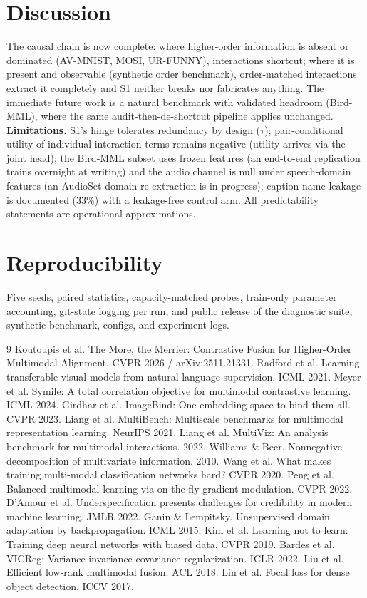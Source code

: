 \documentclass[10pt,twocolumn]{article}
\begin{document}
\section{Discussion}
The causal chain is now complete: where higher-order information is absent or dominated
(AV-MNIST, MOSI, UR-FUNNY), interactions shortcut; where it is present and observable (synthetic
order benchmark), order-matched interactions extract it completely and S1 neither breaks nor
fabricates anything. The immediate future work is a natural benchmark with validated headroom
(Bird-MML), where the same audit-then-de-shortcut pipeline applies unchanged.
\textbf{Limitations.} S1's hinge tolerates redundancy by design ($\tau$); pair-conditional
utility of individual interaction terms remains negative (utility arrives via the joint head);
the Bird-MML subset uses frozen features (an end-to-end replication trains overnight at writing)
and the audio channel is null under speech-domain features (an AudioSet-domain re-extraction is
in progress); caption name leakage is documented ($33\%$) with a leakage-free control arm.
All predictability statements are operational approximations.

\section*{Reproducibility}
Five seeds, paired statistics, capacity-matched probes, train-only parameter accounting,
git-state logging per run, and public release of the diagnostic suite, synthetic benchmark,
configs, and experiment logs.


\begin{thebibliography}{9}\small
{} Koutoupis et al. The More, the Merrier: Contrastive Fusion for Higher-Order
Multimodal Alignment. CVPR 2026 / arXiv:2511.21331.
 Radford et al. Learning transferable visual models from natural language
supervision. ICML 2021.
 Meyer et al. Symile: A total correlation objective for multimodal contrastive
learning. ICML 2024.
 Girdhar et al. ImageBind: One embedding space to bind them all. CVPR 2023.
 Liang et al. MultiBench: Multiscale benchmarks for multimodal representation
learning. NeurIPS 2021.
 Liang et al. MultiViz: An analysis benchmark for multimodal interactions.
2022.
 Williams \& Beer. Nonnegative decomposition of multivariate information. 2010.
 Wang et al. What makes training multi-modal classification networks hard?
CVPR 2020.
 Peng et al. Balanced multimodal learning via on-the-fly gradient modulation. CVPR
2022.
 D'Amour et al. Underspecification presents challenges for credibility in
modern machine learning. JMLR 2022.
 Ganin \& Lempitsky. Unsupervised domain adaptation by backpropagation. ICML 2015.
 Kim et al. Learning not to learn: Training deep neural networks with
biased data. CVPR 2019.
 Bardes et al. VICReg: Variance-invariance-covariance regularization. ICLR 2022.
 Liu et al. Efficient low-rank multimodal fusion. ACL 2018.
 Lin et al. Focal loss for dense object detection. ICCV 2017.
\end{thebibliography}
\end{document}
